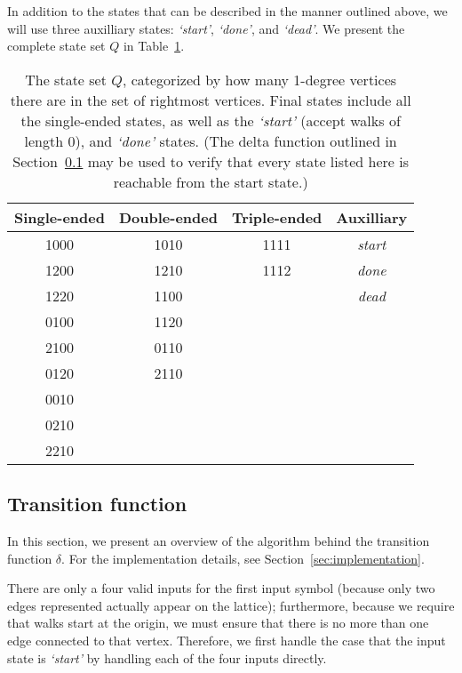 In addition to the states that can be described in the manner outlined above, we will use three auxilliary states: \emph{`start'}, \emph{`done'}, and \emph{`dead'}. We present the complete state set $Q$ in Table~\ref{tab:states}.

\begin{table}
\begin{center}
\begin{tabular}{cccc}
\hline
Single-ended & Double-ended & Triple-ended & Auxilliary \\
\hline
1000 & 1010 & 1111 & \emph{start} \\
1200 & 1210 & 1112 & \emph{done} \\
1220 & 1100 &  & \emph{dead} \\
0100 & 1120 &  &  \\
2100 & 0110 &  &  \\
0120 & 2110 &  &  \\
0010 &  &  &  \\
0210 &  &  &  \\
2210 &  &  &  \\
\hline
\end{tabular}
\end{center}
\caption{The state set $Q$, categorized by how many 1-degree vertices there are in the set of rightmost vertices. Final states include all the single-ended states, as well as the \emph{`start'} (accept walks of length 0), and \emph{`done'} states. (The delta function outlined in Section~\ref{sec:overview-delta} may be used to verify that every state listed here is reachable from the start state.)}
\label{tab:states}
\end{table}

\subsection{Transition function}
\label{sec:overview-delta}

In this section, we present an overview of the algorithm behind the transition function $\delta$. For the implementation details, see Section~\ref{sec:implementation}.

There are only a four valid inputs for the first input symbol (because only two edges represented actually appear on the lattice); furthermore, because we require that walks start at the origin, we must ensure that there is no more than one edge connected to that vertex. Therefore, we first handle the case that the input state is \emph{`start'} by handling each of the four inputs directly.

